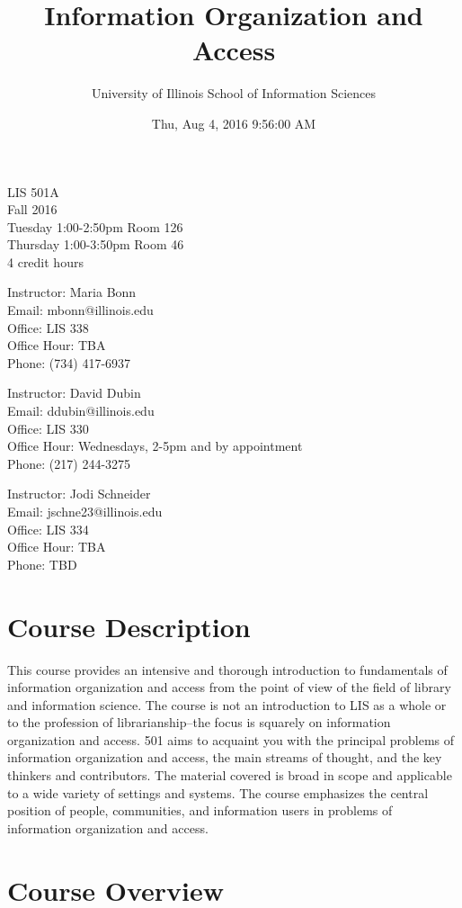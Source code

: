 \documentclass[]{article}
\title{Information Organization and Access}
\author{University of Illinois School of Information Sciences}
\date{Thu, Aug 4, 2016 9:56:00 AM}
\begin{document}
\maketitle

LIS 501A\\
Fall 2016\\
Tuesday 1:00-2:50pm Room 126\\
Thursday 1:00-3:50pm Room 46\\
4 credit hours

Instructor: Maria Bonn\\
Email: mbonn@illinois.edu\\
Office: LIS 338\\
Office Hour: TBA\\
Phone: (734) 417-6937

Instructor: David Dubin\\
Email: ddubin@illinois.edu\\
Office: LIS 330\\
Office Hour: Wednesdays, 2-5pm and by appointment\\
Phone: (217) 244-3275

Instructor: Jodi Schneider\\
Email: jschne23@illinois.edu\\
Office: LIS 334\\
Office Hour: TBA\\
Phone: TBD

\section{Course Description}\label{course-description}

This course provides an intensive and thorough introduction to
fundamentals of information organization and access from the point of
view of the field of library and information science. The course is not
an introduction to LIS as a whole or to the profession of
librarianship--the focus is squarely on information organization and
access. 501 aims to acquaint you with the principal problems of
information organization and access, the main streams of thought, and
the key thinkers and contributors. The material covered is broad in
scope and applicable to a wide variety of settings and systems. The
course emphasizes the central position of people, communities, and
information users in problems of information organization and access.

\section{Course Overview}\label{course-overview}
\end{document}
